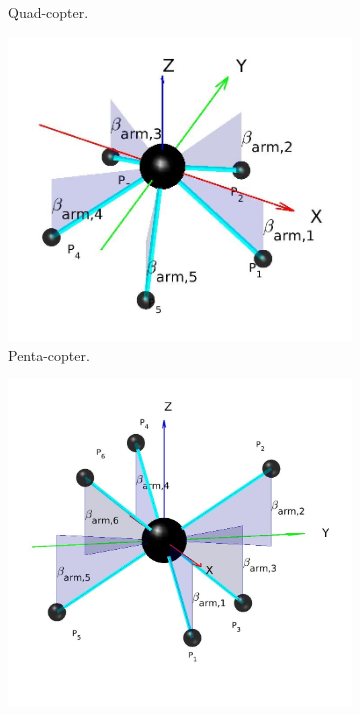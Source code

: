 \begin{figure}[!ht]
\begin{subfigure}[b]{0.48\textwidth}
    \caption{Quad-copter.} \label{fig:comp_quad}
  \end{subfigure}
  \hspace*{\fill} %
  \begin{subfigure}[b]{0.45\textwidth}
    \includegraphics[width=\linewidth]{images/Pentacopter.jpg}
    \caption{Penta-copter.} \label{fig:comp_penta}
  \end{subfigure}
  \hspace*{\fill} %
  \begin{subfigure}[b]{0.45\textwidth}
    \includegraphics[width=\linewidth]{images/Hexacopter.jpg}

\end{subfigure}
\end{figure}
